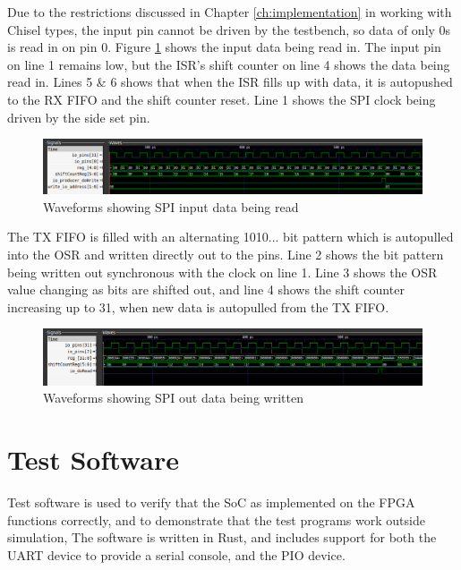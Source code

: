 Due to the restrictions discussed in Chapter \ref{ch:implementation} in working with Chisel  types, the input pin cannot be driven by the testbench, so data of only 0s is read in on pin 0. Figure \ref{fig:spi-1} shows the input data being read in. The input pin on line 1 remains low, but the ISR's shift counter on line 4 shows the data being read in. Lines 5 \& 6 shows that when the ISR fills up with data, it is autopushed to the RX FIFO and the shift counter reset. Line 1 shows the SPI clock being driven by the side set pin.

\begin{figure}[H]
    \centering
    \includegraphics[width=\textwidth]{../img/spi-1.png}
    \caption{Waveforms showing SPI input data being read}
    \label{fig:spi-1}
\end{figure}

The TX FIFO is filled with an alternating 1010... bit pattern which is autopulled into the OSR and written directly out to the pins. Line 2 shows the bit pattern being written out synchronous with the clock on line 1. Line 3 shows the OSR value changing as bits are shifted out, and line 4 shows the shift counter increasing up to 31, when new data is autopulled from the TX FIFO.

\begin{figure}[H]
    \centering
    \includegraphics[width=\textwidth]{../img/spi-2.png}
    \caption{Waveforms showing SPI out data being written}
    \label{fig:spi-2}
\end{figure}

\section{Test Software}

Test software is used to verify that the SoC as implemented on the FPGA functions correctly, and to demonstrate that the test programs work outside simulation, The software is written in Rust, and includes support for both the UART device to provide a serial console, and the PIO device.

